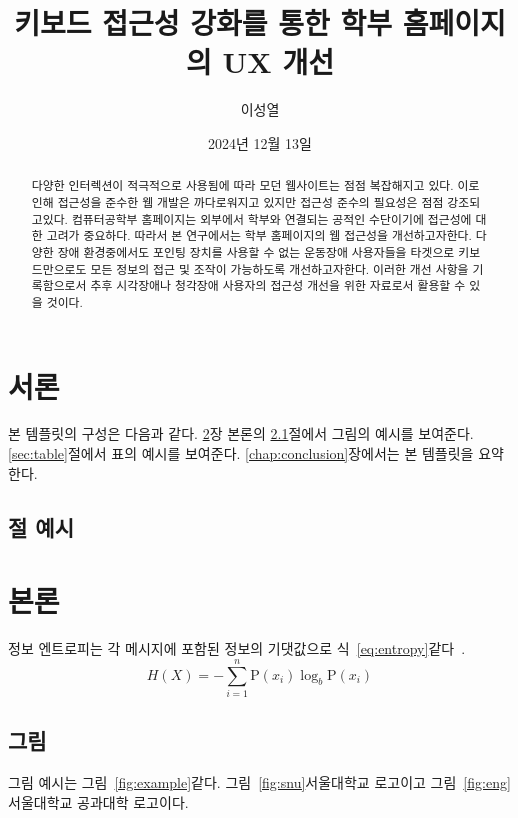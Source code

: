\documentclass[ko]{snu-cse-bsc-thesis}
\title{키보드 접근성 강화를 통한 학부 홈페이지의 UX 개선}
\author{이성열}
\date{2024년 12월 13일}
\begin{document}
\maketitle

\begin{abstract}
다양한 인터렉션이 적극적으로 사용됨에 따라 모던 웹사이트는 점점 복잡해지고 있다. 이로인해 접근성을 준수한 웹 개발은 까다로워지고 있지만 접근성 준수의 필요성은 점점 강조되고있다. 컴퓨터공학부 홈페이지는 외부에서 학부와 연결되는 공적인 수단이기에 접근성에 대한 고려가 중요하다. 따라서 본 연구에서는 학부 홈페이지의 웹 접근성을 개선하고자한다. 다양한 장애 환경중에서도 포인팅 장치를 사용할 수 없는 운동장애 사용자들을 타겟으로 키보드만으로도 모든 정보의 접근 및 조작이 가능하도록 개선하고자한다. 이러한 개선 사항을 기록함으로서 추후 시각장애나 청각장애 사용자의 접근성 개선을 위한 자료로서 활용할 수 있을 것이다. 
\end{abstract}

\tableofcontents
\listoftables
\listoffigures

\chapter{서론}\label{chap:introduction}
본 템플릿의 구성은 다음과 같다.
\ref{chap:body}장 본론의 \ref{sec:picture}절에서 그림의 예시를 보여준다.
\ref{sec:table}절에서 표의 예시를 보여준다.
\ref{chap:conclusion}장에서는 본 템플릿을 요약한다.

\section{절 예시}\label{sec:section}
\jiwon[2-3]


\chapter{본론}\label{chap:body}
정보 엔트로피는 각 메시지에 포함된 정보의 기댓값으로 식~\eqref{eq:entropy}\와 같다~\cite{6773024}.
\begin{equation}\label{eq:entropy}
  H(X) = -\sum_{i=1}^n {\mathrm{P}(x_i) \log_b \mathrm{P}(x_i)}
\end{equation}

\jiwon[4-6]


\section{그림}\label{sec:picture}
그림 예시는 그림~\ref{fig:example}\와 같다. 그림~\ref{fig:snu}\은 서울대학교 로고이고 그림~\ref{fig:eng}\는 서울대학교 공과대학 로고이다.
\end{document}
